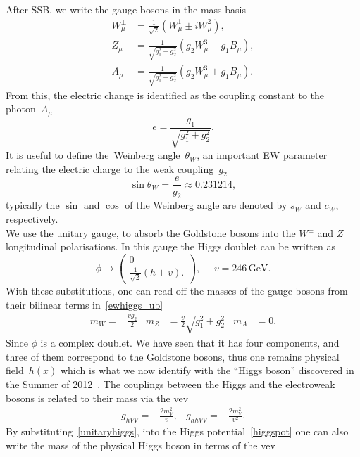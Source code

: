 After SSB, we write the gauge bosons in the mass basis~
\begin{align}
W_\mu^\pm &= \frac{1}{\sqrt{2}} (W^1_\mu\pm iW^2_\mu), \nonumber \\
Z_\mu &= \frac{1}{\sqrt{g_1^2+g_2^2}} \left(g_2 W^3_\mu-g_1B_\mu\right), \\
A_\mu &= \frac{1}{\sqrt{g_1^2+g_2^2}} \left(g_2 W^3_\mu+g_1B_\mu\right). \nonumber
 \end{align}
 From this, the electric change is identified as the coupling constant to the photon~$A_\mu$ 
 \begin{equation}
     e=\frac{g_1}{\sqrt{g_1^2+g_2^2}}.
 \end{equation}
 It is useful to define the~{Weinberg angle}~$\theta_W$, an important EW parameter relating the electric charge to the weak coupling~$g_2$ 
 \begin{equation}
     \sin \theta_W = \frac{e}{g_2} \approx 0.231214,
 \end{equation}
 typically the $\sin$ and $\cos$ of the Weinberg angle are denoted by $s_W$ and $c_W$, respectively. \\ We use the unitary gauge, to absorb the Goldstone bosons into the $W^\pm$ and $Z$ longitudinal polarisations. In this gauge the Higgs doublet can be written as
\begin{equation}
    \phi \to \begin{pmatrix}
       0\\  \frac{1}{\sqrt{2}}(h+v).
    \end{pmatrix}, \,\,\,\,\,\,\,\, v= 246\, \mathrm{GeV}.
    \label{unitaryhiggs}
  \end{equation}
With these substitutions, one can read off the masses of the gauge bosons from their bilinear terms in~\eqref{ewhiggs_ub}
\begin{align}
    m_W =& \frac{vg_2}{2} & m_Z&=\frac{v}{2}\sqrt{g_1^2+g_2^2} & m_A &= 0.
\end{align}
Since $\phi$ is a complex doublet. We have seen that it has four components,  and three of them correspond to the Goldstone bosons, thus one remains physical field~$h(x)$ which is what we now identify with the ``Higgs boson'' discovered in the Summer of 2012~\cite{CMS:2012qbp,ATLAS:2012yve}. The couplings between  the Higgs and the electroweak bosons is related to their mass via the vev 
\begin{align}
    g_{hVV} =& \frac{2 m_V^2}{v}, & g_{hhVV}=& \frac{2 m_V^2}{v^2}.
\end{align}
By substituting~\eqref{unitaryhiggs}, into the Higgs potential~\eqref{higgspot} one can also write the mass of the physical Higgs boson in terms of the vev

